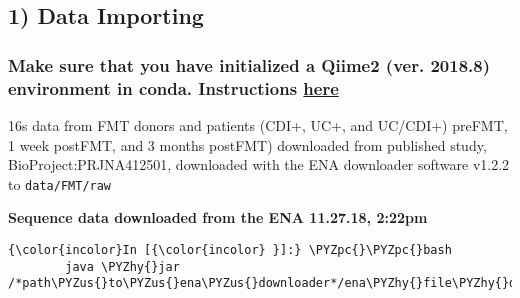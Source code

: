\documentclass[11pt]{article}
\def\PYZus{\char`\_}
\def\PYZpc{\char`\%}
\def\PYZhy{\char`\-}
\begin{document}
    \hypertarget{data-importing}{%
\subsection{1) Data Importing}\label{data-importing}}

\hypertarget{make-sure-that-you-have-initialized-a-qiime2-ver.-2018.8-environment-in-conda.-instructions-here}{%
\subsubsection{\texorpdfstring{Make sure that you have initialized a
Qiime2 (ver. 2018.8) environment in conda. Instructions
\href{https://docs.qiime2.org/2018.8/tutorials/filtering/}{here}}{Make sure that you have initialized a Qiime2 (ver. 2018.8) environment in conda. Instructions here}}\label{make-sure-that-you-have-initialized-a-qiime2-ver.-2018.8-environment-in-conda.-instructions-here}}

    16s data from FMT donors and patients (CDI+, UC+, and UC/CDI+) preFMT, 1
week postFMT, and 3 months postFMT) downloaded from published study,
BioProject:PRJNA412501, downloaded with the ENA downloader software
v1.2.2 to \texttt{data/FMT/raw}

    \textbf{Sequence data downloaded from the ENA 11.27.18, 2:22pm}

    \begin{Verbatim}[commandchars=\\\{\}]
{\color{incolor}In [{\color{incolor} }]:} \PYZpc{}\PYZpc{}bash
        java \PYZhy{}jar /*path\PYZus{}to\PYZus{}ena\PYZus{}downloader*/ena\PYZhy{}file\PYZhy{}downloader\PYZhy{}v1.2.2.jar
\end{Verbatim}
\end{document}
